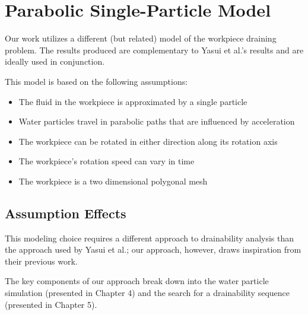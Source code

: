 


\section{Parabolic Single-Particle Model}

Our work utilizes a different (but related) model of the workpiece draining problem. The results produced are complementary to Yasui et al.'s results and are ideally used in conjunction.

This model is based on the following assumptions:

\begin{itemize}
	\item The fluid in the workpiece is approximated by a single particle
	\item Water particles travel in parabolic paths that are influenced by acceleration
	\item The workpiece can be rotated in either direction along its rotation axis
	\item The workpiece's rotation speed can vary in time
	\item The workpiece is a two dimensional polygonal mesh
\end{itemize}

	\subsection{Assumption Effects}

This modeling choice requires a different approach to drainability analysis than the approach used by Yasui et al.; our approach, however, draws inspiration from their previous work.

The key components of our approach break down into the water particle simulation (presented in Chapter 4) and the search for a drainability sequence (presented in Chapter 5).




